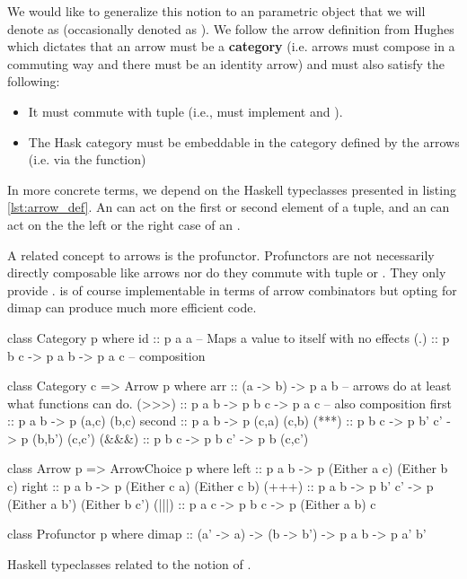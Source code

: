 We would like to generalize this notion to an parametric object that
we will denote as \hask{~>} (occasionally denoted as  ). We
follow the arrow definition from Hughes
\cite{hughesProgrammingArrows2005} which dictates that an arrow must
be a \textbf{category} (i.e. arrows must compose in a commuting way
and there must be an identity arrow) and must also satisfy the
following:

\begin{itemize}
\item It must commute with tuple (i.e., must implement  and
  ).
\item The Hask category must be embeddable in the category defined by the
arrows (i.e. via the  function)
\end{itemize}

In more concrete terms, we depend on the Haskell typeclasses presented
in listing \ref{lst:arrow_def}. An  can act on the first
or second element of a tuple, and an  can act on the
the left or the right case of an .

A related concept to arrows is the profunctor. Profunctors are not
necessarily directly composable like arrows nor do they commute with
tuple or . They only provide . 
is of course implementable in terms of arrow combinators but opting
for dimap can produce much more efficient code.


\begin{code}
\begin{haskellcode}
class Category p where
  id :: p a a -- Maps a value to itself with no effects
  (.) :: p b c -> p a b -> p a c -- composition

class Category c => Arrow p where
  arr :: (a -> b) -> p a b -- arrows do at least what functions can do.
  (>>>) :: p a b -> p b c -> p a c -- also composition
  first :: p a b -> p (a,c) (b,c)
  second :: p a b -> p (c,a) (c,b)
  (***) :: p b c -> p b' c' -> p (b,b') (c,c')
  (&&&) :: p b c -> p b c' -> p b (c,c')

class Arrow p => ArrowChoice p where
  left :: p a b -> p (Either a c) (Either b c)
  right :: p a b -> p (Either c a) (Either c b)
  (+++) :: p a b -> p b' c' -> p (Either a b') (Either b c')
  (|||) :: p a c -> p b c -> p (Either a b) c

class Profunctor p where
  dimap :: (a' -> a) -> (b -> b') -> p a b -> p a' b'
\end{haskellcode}
  \caption{\label{lst:arrow_def}Haskell typeclasses related to the
    notion of .}
\end{code}


